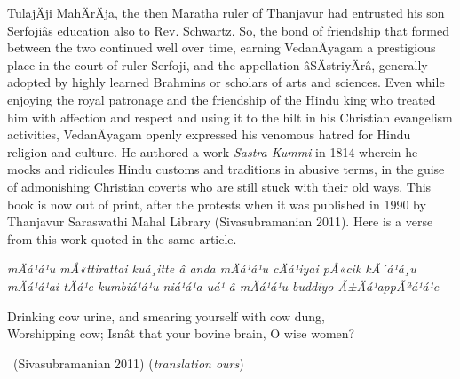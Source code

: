 TulajÄji MahÄrÄja, the then Maratha ruler of Thanjavur had entrusted his son Serfojiâs education also to Rev. Schwartz. So, the bond of friendship that formed between the two continued well over time, earning VedanÄyagam a prestigious place in the court of ruler Serfoji, and the appellation âSÄstriyÄrâ, generally adopted by highly learned Brahmins or scholars of arts and sciences. Even while enjoying the royal patronage and the friendship of the Hindu king who treated him with affection and respect and using it to the hilt in his Christian evangelism activities, VedanÄyagam openly expressed his venomous hatred for Hindu religion and culture. He authored a work \textit{Sastra Kummi} in 1814 wherein he mocks and ridicules Hindu customs and traditions in abusive terms, in the guise of admonishing Christian coverts who are still stuck with their old ways. This book is now out of print, after the protests when it was published in 1990 by Thanjavur Saraswathi Mahal Library (Sivasubramanian 2011). Here is a verse from this work quoted in the same article.

\begin{myquote}
\textit{mÄá¹­á¹­u mÅ«ttirattai kuá¸itte â anda mÄá¹­á¹­u cÄá¹iyai pÅ«cik kÃ´á¹á¸u\\ mÄá¹­á¹­ai tÄá¹e kumbiá¹­á¹­u niá¹á¹a uá¹ â mÄá¹­á¹­u buddiyo Ã±Äá¹appÃªá¹á¹e}
\end{myquote}

\begin{myquote}
\end{myquote}

\begin{myquote}
Drinking cow urine, and smearing yourself with cow dung,\\ Worshipping cow; Isnât that your bovine brain, O wise women? 

~\hfill (Sivasubramanian 2011) (\textit{translation ours})
\end{myquote}

\newpage

